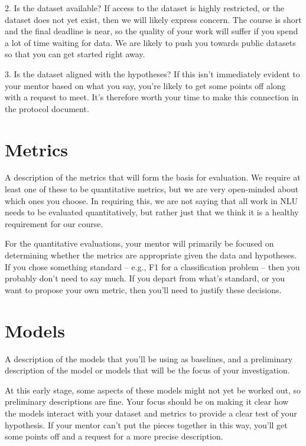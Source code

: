 \documentclass[11pt]{article}
\begin{document}
2. Is the dataset available? If access to the dataset is highly restricted, or the dataset does not yet exist, then we will likely express concern. The course is short and the final deadline is near, so the quality of your work will suffer if you spend a lot of time waiting for data. We are likely to push you towards public datasets so that you can get started right away.

3. Is the dataset aligned with the hypotheses? If this isn't immediately evident to your mentor based on what you say, you're likely to get some points off along with a request to meet. It's therefore worth your time to make this connection in the protocol document.



\section{Metrics} 

A description of the metrics that will form the basis for evaluation. We require at least one of these to be quantitative metrics, but we are very open-minded about which ones you choose. In requiring this, we are not saying that all work in NLU needs to be evaluated quantitatively, but rather just that we think it is a healthy requirement for our course.

For the quantitative evaluations, your mentor will primarily be focused on determining whether the metrics are appropriate given the data and hypotheses. If you chose something standard – e.g., F1 for a classification problem – then you probably don't need to say much. If you depart from what's standard, or you want to propose your own metric, then you'll need to justify these decisions.

\section{Models} 

A description of the models that you'll be using as baselines, and a preliminary description of the model or models that will be the focus of your investigation.

At this early stage, some aspects of these models might not yet be worked out, so preliminary descriptions are fine. Your focus should be on making it clear how the models interact with your dataset and metrics to provide a clear test of your hypothesis. If your mentor can't put the pieces together in this way, you'll get some points off and a request for a more precise description.
\end{document}
